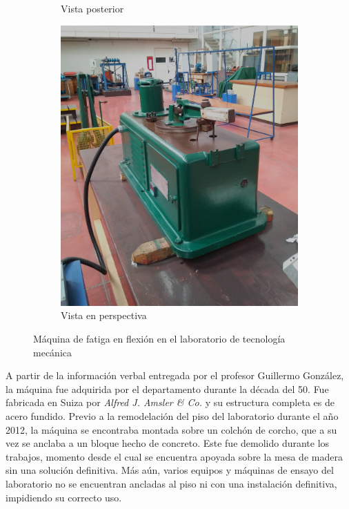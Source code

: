 \begin{figure}[h]
\begin{subfigure}{0.49\linewidth}
		\caption{Vista posterior}\label{fig:maqfull_post}
	\end{subfigure}
	\begin{subfigure}{0.5\linewidth}
		\centering		
		\includegraphics[width=1\linewidth]{Imagenes/maq_iso.jpg}
		\caption{Vista en perspectiva}\label{fig:maq_iso}		
	\end{subfigure}
\caption{Máquina de fatiga en flexión en el laboratorio de tecnología mecánica}
\label{fig:maq_fat}
\end{figure}

A partir de la información verbal entregada por el profesor Guillermo González, la máquina fue adquirida por el departamento durante la década del 50. Fue fabricada en Suiza por \textit{Alfred J. Amsler \& Co.} y su estructura completa es de acero fundido. Previo a la remodelación del piso del laboratorio durante el año 2012, la máquina se encontraba montada sobre un colchón de corcho, que a su vez se anclaba a un bloque hecho de concreto. Este fue demolido durante los trabajos, momento desde el cual se encuentra apoyada sobre la mesa de madera sin una solución definitiva. Más aún, varios equipos y máquinas de ensayo del laboratorio no se encuentran ancladas al piso ni con una instalación definitiva, impidiendo su correcto uso.


